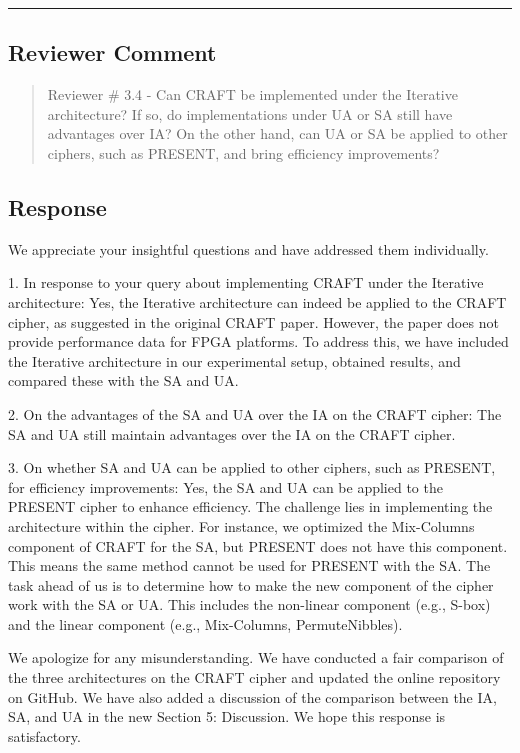 \noindent\rule{\linewidth}{2.0pt}

\subsection{Reviewer Comment}
\begin{mdframed}
	\begin{quote}
		Reviewer \# 3.4 - Can CRAFT be implemented under the Iterative architecture? If so, do implementations under UA or SA still have advantages over IA? On the other hand, can UA or SA be applied to other ciphers, such as PRESENT, and bring efficiency improvements?
	\end{quote}
\end{mdframed}

\subsection{Response}

We appreciate your insightful questions and have addressed them individually. 

1. In response to your query about implementing CRAFT under the Iterative architecture: Yes, the Iterative architecture can indeed be applied to the CRAFT cipher, as suggested in the original CRAFT paper. However, the paper does not provide performance data for FPGA platforms. To address this, we have included the Iterative architecture in our experimental setup, obtained results, and compared these with the SA and UA.

2. On the advantages of the SA and UA over the IA on the CRAFT cipher: The SA and UA still maintain advantages over the IA on the CRAFT cipher.

3. On whether SA and UA can be applied to other ciphers, such as PRESENT, for efficiency improvements: Yes, the SA and UA can be applied to the PRESENT cipher to enhance efficiency. The challenge lies in implementing the architecture within the cipher. For instance, we optimized the Mix-Columns component of CRAFT for the SA, but PRESENT does not have this component. This means the same method cannot be used for PRESENT with the SA. The task ahead of us is to determine how to make the new component of the cipher work with the SA or UA. This includes the non-linear component (e.g., S-box) and the linear component (e.g., Mix-Columns, PermuteNibbles).

We apologize for any misunderstanding. We have conducted a fair comparison of the three architectures on the CRAFT cipher and updated the online repository on GitHub. We have also added a discussion of the comparison between the IA, SA, and UA in the new Section 5: Discussion. We hope this response is satisfactory.



